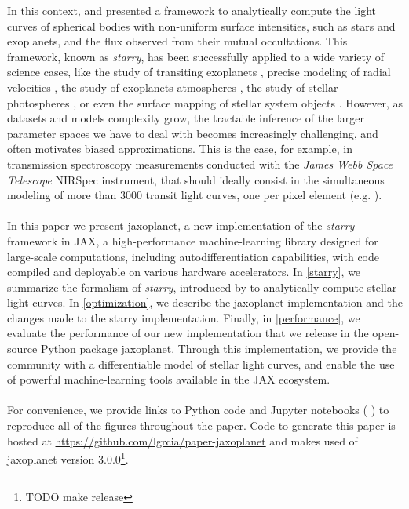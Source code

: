 \documentclass[modern]{aastex631}
\begin{document}
In this context, \cite{starry} and \cite{Agol2020} presented a framework to analytically compute the light curves of spherical bodies with non-uniform surface intensities, such as stars and exoplanets, and the flux observed from their mutual occultations. This framework, known as \textit{starry}, has been successfully applied to a wide variety of science cases, like the study of transiting exoplanets \citep{Kostov2019}, precise modeling of radial velocities \citep{Dawson2021}, the study of exoplanets atmospheres \citep{Bell2023}, the study of stellar photospheres \citep{Almenara2022}, or even the surface mapping of stellar system objects \citep{Bartolic2022}. However, as datasets and models complexity grow, the tractable inference of the larger parameter spaces we have to deal with becomes increasingly challenging, and often motivates biased approximations. This is the case, for example, in transmission spectroscopy measurements conducted with the \textit{James Webb Space Telescope} NIRSpec instrument, that should ideally consist in the simultaneous modeling of more than 3000 transit light curves, one per pixel element (e.g. \citealt{Alderson2023}).\\\\
In this paper we present \textsf{jaxoplanet}, a new implementation of the \textit{starry} framework in \textsf{JAX}, a high-performance machine-learning library designed for large-scale computations, including autodifferentiation capabilities, with code compiled and deployable on various hardware accelerators. In \autoref{starry}, we summarize the formalism of \textit{starry}, introduced by \cite{starry} to analytically compute stellar light curves. In \autoref{optimization}, we describe the \textsf{jaxoplanet} implementation and the changes made to the \textsf{starry} implementation. Finally, in \autoref{performance}, we evaluate the performance of our new implementation that we release in the open-source Python package \textsf{jaxoplanet}. Through this implementation, we provide the community with a differentiable model of stellar light curves, and enable the use of powerful machine-learning tools available in the \textsf{JAX} ecosystem.\\\\
For convenience, we provide links to Python code and Jupyter notebooks ( \codelink{}) to reproduce all of the figures throughout the paper. Code to generate this paper is hosted at \href{https://github.com/lgrcia/paper-jaxoplanet}{https://github.com/lgrcia/paper-jaxoplanet} and makes used of \textsf{jaxoplanet} version 3.0.0\footnote{TODO make release}.
\end{document}
